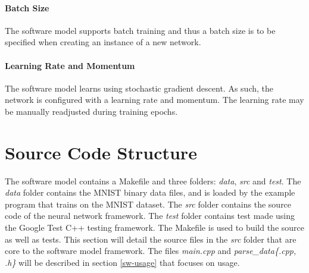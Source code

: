 \paragraph{Batch Size}
The software model supports batch training and thus a batch size is to be specified when creating an instance of a new network.
\paragraph{Learning Rate and Momentum}
The software model learns using stochastic gradient descent. As such, the network is configured with a learning rate and momentum. The learning rate may be manually readjusted during training epochs.



\section{Source Code Structure}
The software model contains a Makefile and three folders: \textit{data}, \textit{src} and \textit{test}. The \textit{data} folder contains the MNIST binary data files, and is loaded by the example program that trains on the MNIST dataset. The \textit{src} folder contains the source code of the neural network framework. The \textit{test} folder contains test made using the Google Test C++ testing framework. The Makefile is used to build the source as well as tests. This section will detail the source files in the \textit{src} folder that are core to the software model framework. The files \textit{main.cpp} and \textit{parse\_data\{.cpp, .h\}} will be described in section \ref{sw-usage} that focuses on usage.

